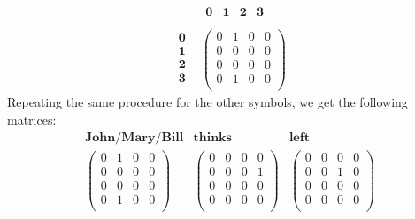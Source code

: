 \[
    \begin{array}{cc}
        &
        \begin{array}{cccc}
            \textbf{0} &
            \textbf{1} &
            \textbf{2} &
            \textbf{3} \\
        \end{array}
        \\
        \begin{array}{cccc}
            \textbf{0} \\
            \textbf{1} \\
            \textbf{2} \\
            \textbf{3} \\
        \end{array}
        &
        \left (
            \begin{array}{cccc}
                0 & 1 & 0 & 0\\
                0 & 0 & 0 & 0\\
                0 & 0 & 0 & 0\\
                0 & 1 & 0 & 0\\
            \end{array}
        \right )
    \end{array}
\]
Repeating the same procedure for the other symbols, we get the following matrices:
%
\[
    \begin{array}{ccc}
        \textbf{John}/\textbf{Mary}/\textbf{Bill} & \textbf{thinks} & \textbf{left}\\
        \begin{pmatrix}
            0 & 1 & 0 & 0\\
            0 & 0 & 0 & 0\\
            0 & 0 & 0 & 0\\
            0 & 1 & 0 & 0\\
        \end{pmatrix}
        &
        \begin{pmatrix}
            0 & 0 & 0 & 0\\
            0 & 0 & 0 & 1\\
            0 & 0 & 0 & 0\\
            0 & 0 & 0 & 0\\
        \end{pmatrix}
        &
        \begin{pmatrix}
            0 & 0 & 0 & 0\\
            0 & 0 & 1 & 0\\
            0 & 0 & 0 & 0\\
            0 & 0 & 0 & 0\\
        \end{pmatrix}
    \end{array}
\]
